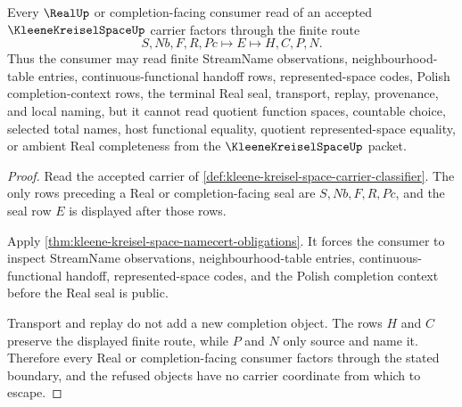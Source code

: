 \begin{theorem}
\label{thm:kleene-kreisel-space-real-completion-boundary}
Every $\RealUp$ or completion-facing consumer read of an accepted $\KleeneKreiselSpaceUp$ carrier factors through the finite route
$$
S,Nb,F,R,Pc \longmapsto E \longmapsto H,C,P,N .
$$
Thus the consumer may read finite StreamName observations, neighbourhood-table entries, continuous-functional handoff rows, represented-space codes, Polish completion-context rows, the terminal Real seal, transport, replay, provenance, and local naming, but it cannot read quotient function spaces, countable choice, selected total names, host functional equality, quotient represented-space equality, or ambient Real completeness from the $\KleeneKreiselSpaceUp$ packet.
\end{theorem}
\begin{proof}
Read the accepted carrier of \autoref{def:kleene-kreisel-space-carrier-classifier}. The only rows preceding a Real or completion-facing seal are $S,Nb,F,R,Pc$, and the seal row $E$ is displayed after those rows.

Apply \autoref{thm:kleene-kreisel-space-namecert-obligations}. It forces the consumer to inspect StreamName observations, neighbourhood-table entries, continuous-functional handoff, represented-space codes, and the Polish completion context before the Real seal is public.

Transport and replay do not add a new completion object. The rows $H$ and $C$ preserve the displayed finite route, while $P$ and $N$ only source and name it. Therefore every Real or completion-facing consumer factors through the stated boundary, and the refused objects have no carrier coordinate from which to escape.
\end{proof}


